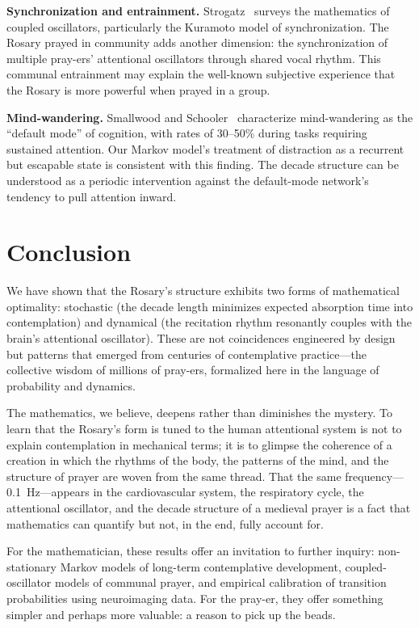 \documentclass[journal]{IEEEtran}
\theoremstyle{definition}
\theoremstyle{remark}
\begin{document}
\textbf{Synchronization and entrainment.} Strogatz~\cite{strogatz2000} surveys the mathematics of coupled oscillators, particularly the Kuramoto model of synchronization. The Rosary prayed in community adds another dimension: the synchronization of multiple pray-ers' attentional oscillators through shared vocal rhythm. This communal entrainment may explain the well-known subjective experience that the Rosary is more powerful when prayed in a group.

\textbf{Mind-wandering.} Smallwood and Schooler~\cite{smallwood2006} characterize mind-wandering as the ``default mode'' of cognition, with rates of 30--50\% during tasks requiring sustained attention. Our Markov model's treatment of distraction as a recurrent but escapable state is consistent with this finding. The decade structure can be understood as a periodic intervention against the default-mode network's tendency to pull attention inward.

\section{Conclusion}\label{sec:conclusion}

We have shown that the Rosary's structure exhibits two forms of mathematical optimality: stochastic (the decade length minimizes expected absorption time into contemplation) and dynamical (the recitation rhythm resonantly couples with the brain's attentional oscillator). These are not coincidences engineered by design but patterns that emerged from centuries of contemplative practice---the collective wisdom of millions of pray-ers, formalized here in the language of probability and dynamics.

The mathematics, we believe, deepens rather than diminishes the mystery. To learn that the Rosary's form is tuned to the human attentional system is not to explain contemplation in mechanical terms; it is to glimpse the coherence of a creation in which the rhythms of the body, the patterns of the mind, and the structure of prayer are woven from the same thread. That the same frequency---0.1~Hz---appears in the cardiovascular system, the respiratory cycle, the attentional oscillator, and the decade structure of a medieval prayer is a fact that mathematics can quantify but not, in the end, fully account for.

For the mathematician, these results offer an invitation to further inquiry: non-stationary Markov models of long-term contemplative development, coupled-oscillator models of communal prayer, and empirical calibration of transition probabilities using neuroimaging data. For the pray-er, they offer something simpler and perhaps more valuable: a reason to pick up the beads.
\end{document}
